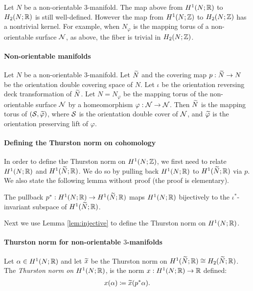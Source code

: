 Let $N$ be a non-orientable 3-manifold.  The map above from $H^1(N;\mathbb{R})$ to $H_2(N;\mathbb{R})$ is still well-defined.
However the map from $H^1(N; \mathbb{Z})$ to $H_2(N; \mathbb{Z})$ has a nontrivial kernel.  For example, when $N_{\varphi}$ is the mapping torus of a non-orientable surface $\mathcal{N}$, as above, the fiber is trivial in $H_2(N;\mathbb{Z})$.

\paragraph{Non-orientable manifolds}
Let $N$ be a non-orientable $3$-manifold.  Let $\widetilde{N}$ and the covering map $p:\widetilde{N}\rightarrow N$ be the orientation double covering space of $N$.
Let $\iota$ be the orientation reversing deck transformation
of $\widetilde{N}$.
Let $N=N_\varphi$ be the mapping torus of the non-orientable surface $\mathcal{N}$ by a homeomorphism $\varphi: \mathcal{N} \to \mathcal{N}$. Then $\widetilde{N}$ is the mapping torus of $(\mathcal{S}, \widetilde{\varphi})$, where $\mathcal{S}$ is the orientation double cover of $\mathcal{N}$, and $\widetilde{\varphi}$ is the orientation preserving lift of $\varphi$.

\paragraph{Defining the Thurston norm on cohomology} In order to define the Thurston norm on $H^1(N;\mathbb{Z})$, we first need to relate $H^1(N; \mathbb{R})$ and $H^1(\widetilde{N}; \mathbb{R})$.
We do so by pulling back $H^1(N;\mathbb{R})$ to $H^1(\widetilde{N};\mathbb{R})$ via $p$. We also state the following lemma without proof (the proof is elementary).

\begin{lem}
  \label{lem:injective}
  The pullback $p^{\ast}:H^1(N;\mathbb{R})\rightarrow H^1(\widetilde{N};\mathbb{R})$ maps $H^1(N; \mathbb{R})$ bijectively to the $\iota^{\ast}$-invariant subspace of   $H^1(\widetilde{N}; \mathbb{R})$.
\end{lem}

Next we use Lemma \ref{lem:injective} to define the Thurston norm on $H^1(N; \mathbb{R})$.

\paragraph{Thurston norm for non-orientable $3$-manifolds}
  Let $\alpha \in H^1(N;\mathbb{R})$ and let $\widetilde{x}$ be the Thurston norm on $H^1(\widetilde{N};\mathbb{R})\cong H_2(\widetilde{N};\mathbb{R})$.
  The \emph{Thurston norm on $H^1(N; \mathbb{R})$}, is the norm $x: H^1(N;\mathbb{R}) \rightarrow \mathbb{R}$ defined:
  \begin{align*}
    x(\alpha) \coloneqq \widetilde{x}(p^{\ast}\alpha).
  \end{align*}

